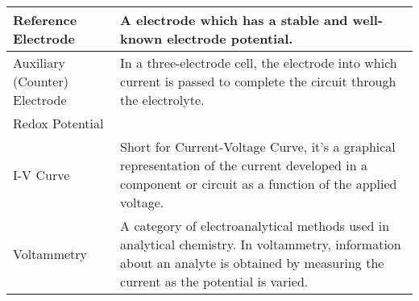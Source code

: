 \documentclass{article}
\begin{document}
\begin{table}[H]
\begin{tabular}{|l|p{10cm}|}
    \hline
    Reference Electrode & A electrode which has a stable and well-known electrode potential. \\
    \hline
    Auxiliary (Counter) Electrode & In a three-electrode cell, the electrode into which current is passed to complete the circuit through the electrolyte. \\
    \hline
    Redox Potential &  \\
    \hline
    I-V Curve & Short for Current-Voltage Curve, it's a graphical representation of the current developed in a component or circuit as a function of the applied voltage.\\
    \hline
    Voltammetry & A category of electroanalytical methods used in analytical chemistry. In voltammetry, information about an analyte is obtained by measuring the current as the potential is varied.\\
    \hline
  \end{tabular}
\end{table}
   
\newpage
\end{document}
